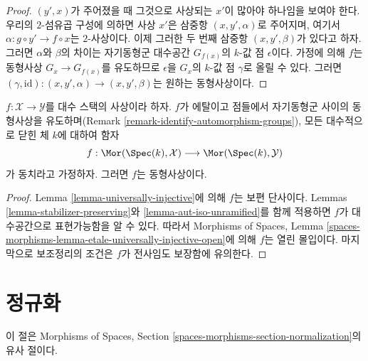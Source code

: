 \begin{proof}
$(y', x)$가 주어졌을 때 그것으로 사상되는 $x'$이 많아야 하나임을
보여야 한다. 우리의 $2$-섬유곱 구성에 의하면 사상 $x'$은 삼중항
$(x, y', \alpha)$로 주어지며, 여기서
$\alpha : g \circ y' \to f \circ x$는 $2$-사상이다. 이제 그러한 두 번째
삼중항 $(x, y', \beta)$가 있다고 하자. 그러면 $\alpha$와 $\beta$의
차이는 자기동형군 대수공간 $G_{f(x)}$의 $k$-값 점 $\epsilon$이다.
가정에 의해 $f$는 동형사상 $G_x \to G_{f(x)}$를 유도하므로
$\epsilon$을 $G_x$의 $k$-값 점 $\gamma$로 올릴 수 있다. 그러면
$(\gamma, \text{id}) : (x, y', \alpha) \to (x, y', \beta)$는 원하는
동형사상이다.
\end{proof}

\begin{lemma}
\label{lemma-etale-iso}
$f : \mathcal{X} \to \mathcal{Y}$를 대수 스택의 사상이라 하자. $f$가
에탈이고 점들에서 자기동형군 사이의 동형사상을 유도하며(Remark
\ref{remark-identify-automorphism-groups}), 모든 대수적으로 닫힌 체
$k$에 대하여 함자
$$
f : \Mor(\Spec(k), \mathcal{X}) \longrightarrow \Mor(\Spec(k), \mathcal{Y})
$$
가 동치라고 가정하자. 그러면 $f$는 동형사상이다.
\end{lemma}

\begin{proof}
Lemma \ref{lemma-universally-injective}에 의해 $f$는 보편 단사이다.
Lemmas \ref{lemma-stabilizer-preserving}와
\ref{lemma-aut-iso-unramified}를 함께 적용하면 $f$가 대수공간으로
표현가능함을 알 수 있다. 따라서 Morphisms of Spaces, Lemma
\ref{spaces-morphisms-lemma-etale-universally-injective-open}에 의해 $f$는
열린 몰입이다. 마지막으로 보조정리의 조건은 $f$가 전사임도 보장함에
유의한다.
\end{proof}







\section{정규화}
\label{section-normalization}

\noindent
이 절은 Morphisms of Spaces, Section
\ref{spaces-morphisms-section-normalization}의 유사 절이다.


